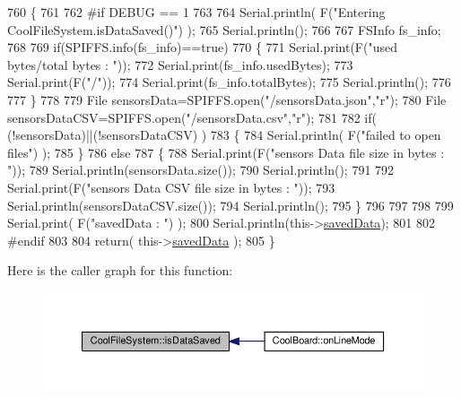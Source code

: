 \begin{DoxyCode}
760 \{
761 
762 \textcolor{preprocessor}{#if DEBUG == 1 }
763 
764     Serial.println( F(\textcolor{stringliteral}{"Entering CoolFileSystem.isDataSaved()"}) );
765     Serial.println();
766 
767     FSInfo fs\_info;
768 
769     \textcolor{keywordflow}{if}(SPIFFS.info(fs\_info)==\textcolor{keyword}{true})
770     \{
771         Serial.print(F(\textcolor{stringliteral}{"used bytes/total bytes : "}));   
772         Serial.print(fs\_info.usedBytes);
773         Serial.print(F(\textcolor{stringliteral}{"/"}));
774         Serial.print(fs\_info.totalBytes);
775         Serial.println();
776 
777     \}
778 
779     File sensorsData=SPIFFS.open(\textcolor{stringliteral}{"/sensorsData.json"},\textcolor{stringliteral}{"r"});
780     File sensorsDataCSV=SPIFFS.open(\textcolor{stringliteral}{"/sensorsData.csv"},\textcolor{stringliteral}{"r"});
781     
782     \textcolor{keywordflow}{if}( (!sensorsData)||(!sensorsDataCSV) ) 
783     \{
784         Serial.println( F(\textcolor{stringliteral}{"failed to open files"}) );        
785     \}
786     \textcolor{keywordflow}{else}
787     \{       
788             Serial.print(F(\textcolor{stringliteral}{"sensors Data file size in bytes : "}));
789             Serial.println(sensorsData.size());
790             Serial.println();
791             
792             Serial.print(F(\textcolor{stringliteral}{"sensors Data CSV file size in bytes : "}));              
793             Serial.println(sensorsDataCSV.size());
794             Serial.println();
795     \}
796 
797 
798 
799     Serial.print( F(\textcolor{stringliteral}{"savedData : "}) );
800     Serial.println(this->\hyperlink{class_cool_file_system_ad9f5b739a32100f5f21270c3d9ee2b1d}{savedData});
801 
802 \textcolor{preprocessor}{#endif}
803 
804     \textcolor{keywordflow}{return}( this->\hyperlink{class_cool_file_system_ad9f5b739a32100f5f21270c3d9ee2b1d}{savedData} );
805 \}
\end{DoxyCode}
Here is the caller graph for this function\+:\nopagebreak
\begin{figure}[H]
\begin{center}
\leavevmode
\includegraphics[width=350pt]{db/d0c/class_cool_file_system_ac86a40e7c3a1842f7342f698d34324f9_icgraph}
\end{center}
\end{figure}
\mbox{\label{class_cool_file_system_afa3a4feae94871d4d3b6bebb701c2e67}} 
